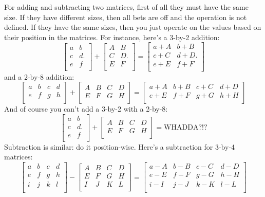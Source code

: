 For adding and subtracting two matrices, first of all they must have
the same size. If they have different sizes, then all bets are off
and the operation is not defined.
If they have the same sizes, then you just operate on the values
based on their position in the matrices.
For instance, here's a 3-by-2 addition:
\[
\begin{bmatrix}
a & b \\
c & d.\\
e & f \\
\end{bmatrix}
+
\begin{bmatrix}
A & B \\
C & D.\\
E & F \\
\end{bmatrix}
=
\begin{bmatrix}
a+A & b+B \\
c+C & d+D.\\
e+E & f+F \\
\end{bmatrix}
\]
and a 2-by-8 addition:
\[
\begin{bmatrix}
a & b & c & d\\
e & f & g & h \\
\end{bmatrix}
+
\begin{bmatrix}
A & B & C & D\\
E & F & G & H \\
\end{bmatrix}
=
\begin{bmatrix}
a+A & b+B & c+C & d+D\\
e+E & f+F & g+G & h+H \\
\end{bmatrix}
\]
And of course you can't add a 3-by-2 with a 2-by-8:
\[
\begin{bmatrix}
a & b \\
c & d.\\
e & f \\
\end{bmatrix}
+
\begin{bmatrix}
A & B & C & D\\
E & F & G & H \\
\end{bmatrix}
= \text{WHADDA?!?}
\]
Subtraction is similar: do it position-wise.
Here's a subtraction for 3-by-4 matrices:
\[
\begin{bmatrix}
a & b & c & d \\
e & f & g & h \\
i & j & k & l \\
\end{bmatrix}
-
\begin{bmatrix}
A & B & C & D\\
E & F & G & H \\
I & J & K & L \\
\end{bmatrix}
=
\begin{bmatrix}
a-A & b-B & c-C & d-D\\
e-E & f-F & g-G & h-H \\
i-I & j-J & k-K & l-L \\
\end{bmatrix}
\]
